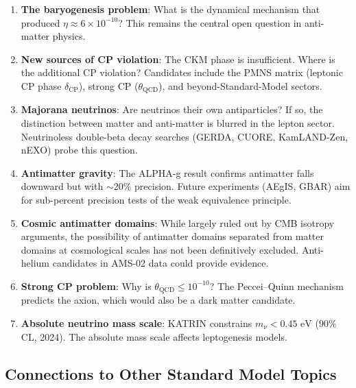 \documentclass[12pt]{article}
\theoremstyle{definition}
\theoremstyle{remark}
\begin{document}
\begin{enumerate}
    \item \textbf{The baryogenesis problem}: What is the dynamical mechanism that
    produced $\eta \approx 6 \times 10^{-10}$? This remains the central open question
    in anti-matter physics.

    \item \textbf{New sources of CP violation}: The CKM phase is insufficient. Where
    is the additional CP violation? Candidates include the PMNS matrix (leptonic CP phase
    $\delta_{\text{CP}}$), strong CP ($\theta_{\text{QCD}}$), and beyond-Standard-Model sectors.

    \item \textbf{Majorana neutrinos}: Are neutrinos their own antiparticles? If so,
    the distinction between matter and anti-matter is blurred in the lepton sector.
    Neutrinoless double-beta decay searches (GERDA, CUORE, KamLAND-Zen, nEXO) probe
    this question.

    \item \textbf{Antimatter gravity}: The ALPHA-g result confirms antimatter falls
    downward but with $\sim 20\%$ precision. Future experiments (AEgIS, GBAR) aim for
    sub-percent precision tests of the weak equivalence principle.

    \item \textbf{Cosmic antimatter domains}: While largely ruled out by CMB isotropy
    arguments, the possibility of antimatter domains separated from matter domains at
    cosmological scales has not been definitively excluded. Anti-helium candidates
    in AMS-02 data could provide evidence.

    \item \textbf{Strong CP problem}: Why is $\theta_{\text{QCD}} \leq 10^{-10}$?
    The Peccei--Quinn mechanism predicts the axion, which would also be a dark matter
    candidate.

    \item \textbf{Absolute neutrino mass scale}: KATRIN constrains $m_\nu < 0.45\text{ eV}$
    (90\% CL, 2024). The absolute mass scale affects leptogenesis models.
\end{enumerate}

\subsection{Connections to Other Standard Model Topics}
\end{document}
